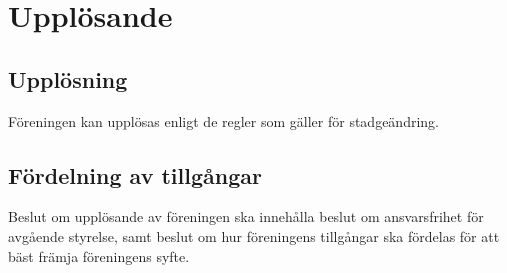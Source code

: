 \documentclass[11pt,a4paper]{article}
\begin{document}
\section{Upplösande}

\subsection{Upplösning}
Föreningen kan upplösas enligt de regler som gäller för stadgeändring.
\subsection{Fördelning av tillgångar}
Beslut om upplösande av föreningen ska innehålla beslut om
ansvarsfrihet för avgående styrelse, samt beslut om hur föreningens
tillgångar ska fördelas för att bäst främja föreningens syfte.
\end{document}
